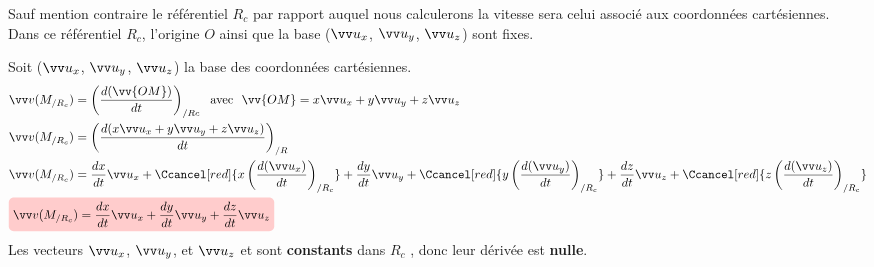 \documentclass[10.5pt,a4paper]{book}
\begin{document}
Sauf mention contraire le référentiel $R_c$ par rapport auquel nous calculerons la vitesse sera celui associé aux coordonnées cartésiennes. \\
Dans ce référentiel $R_c$, l'origine $O$ ainsi que la base ($\vv u_x$, $\vv u_y$, $\vv u_z$) sont fixes.

\begin{boite}
Soit ($\vv u_x$, $\vv u_y$, $\vv u_z$) la base des coordonnées cartésiennes.
\begin{align*}
    &\vv v(M_{/R_c})=\left(\frac{d(\vv{OM})}{dt}\right)_{/Rc} \ \ \text{avec} \ \ \vv{OM} = x \vv u_x + y \vv u_y + z \vv u_z\\
    &\vv v(M_{/R_c})=\left(\frac{d(x \vv u_x + y \vv u_y + z \vv u_z)}{dt}\right)_{/R}\\
    &\vv v(M_{/R_c})=\frac{dx}{dt}\vv u_x + \Ccancel[red]{x\left(\frac{d(\vv u_x)}{dt}\right)_{/R_c}} + \frac{dy}{dt}\vv u_y + \Ccancel[red]{y\left(\frac{d(\vv u_y)}{dt}\right)_{/R_c}} + \frac{dz}{dt}\vv u_z +  \Ccancel[red]{z\left(\frac{d(\vv u_z)}{dt}\right)_{/R_c}}\\
        &\tikz[baseline]{
            \node[fill=red!20,anchor=base,rounded corners]
            {$\vv v(M_{/R_c})=\dfrac{dx}{dt}\vv u_x + \dfrac{dy}{dt}\vv u_y + \dfrac{dz}{dt}\vv u_z$};
        } 
\end{align*}
Les vecteurs $\vv u_x$, $\vv u_y$, et $\vv u_z$ et sont \textbf{constants} dans $R_c$ , donc leur dérivée est \textbf{nulle}.

\end{boite}
\end{document}

